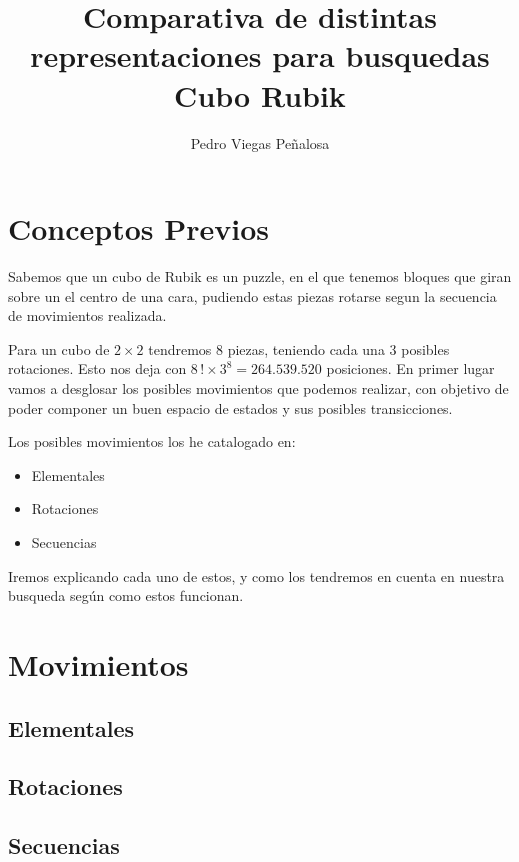 \documentclass[11pt]{article}
\title{Comparativa de distintas representaciones para busquedas Cubo Rubik}
\author{Pedro Viegas Peñalosa}
\date{}
\begin{document}
\maketitle
\section{Conceptos Previos}
	Sabemos que un cubo de Rubik es un puzzle, en el que tenemos bloques que giran sobre un el centro de una cara, pudiendo estas piezas rotarse segun la secuencia de movimientos realizada.

	Para un cubo de $2\times 2$ tendremos 8 piezas, teniendo cada una 3 posibles rotaciones. Esto nos deja con $8\,! \times 3^{8} = 264.539.520$ posiciones.
	En primer lugar vamos a desglosar los posibles movimientos que podemos realizar, con objetivo de poder componer un buen espacio de estados y sus posibles transicciones.

	Los posibles movimientos los he catalogado en:

\begin{itemize}
	\item Elementales
	\item Rotaciones
	\item Secuencias
\end{itemize}

	Iremos explicando cada uno de estos, y como los tendremos en cuenta en nuestra busqueda según como estos funcionan.

\section{Movimientos}

\subsection{Elementales}
\subsection{Rotaciones}
\subsection{Secuencias}
\end{document}
